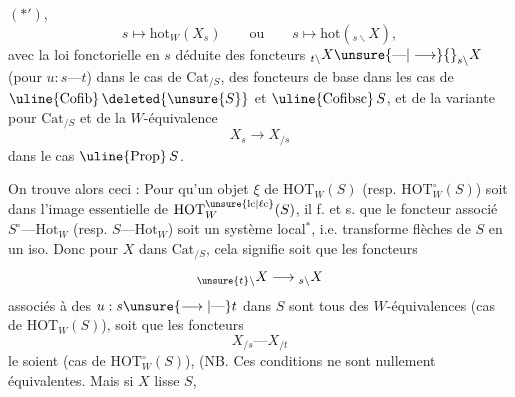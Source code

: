 $(*')$, 
\[
 s\longmapsto\mathrm{hot}_W(X_s)\qquad\text{ou}\qquad s\longmapsto\mathrm{hot}({}_{s\backslash}X),
\]
avec la loi fonctorielle en $s$ déduite des foncteurs ${}_{t\backslash}X\unsure{\text{---}|\longrightarrow}{}_{s\backslash}X$ (pour $u:s\text{---}t$) dans le cas de $\mathrm{Cat}_{/S}$, des foncteurs  de base dans les cas de $\text{\uline{Cofib}}\,\deleted{\unsure{S}}$ et $\text{\uline{Cofibsc}}\,S$, et de la variante pour $\mathrm{Cat}_{/S}$ et de la $W$-équivalence
\[
 X_s\longrightarrow X_{/s}
\]
dans le cas  $\text{\uline{Prop}}\,S$.

On trouve alors ceci :
Pour qu'un objet $\xi$ de $\mathrm{HOT}_W(S)$ (resp. $\mathrm{HOT}^\circ_W(S)$) soit dans l'image essentielle de $\mathrm{HOT}^{\unsure{\mathrm{lc}|\ell\mathrm{c}}}_W(S)$, il f. et s. que le foncteur associé $S^\circ\text{---}\mathrm{Hot}_W$ (resp. $S\text{---}\mathrm{Hot}_W$) soit un système local${}^*$, i.e. transforme  flèches de $S$ en un iso. 
Donc pour  $X$ dans $\mathrm{Cat}_{/S}$, cela signifie soit que les foncteurs
\[
 {}_{\unsure{t}\backslash}X\longrightarrow{}_{s\backslash}X
\]
associés à des $u:s\unsure{\longrightarrow|\text{---}}t$ dans $S$ sont tous des $W$-équivalences (cas de $\mathrm{HOT}_W(S)$), soit que les foncteurs
\[
 X_{/s}\text{---}X_{/t}
\]
le soient (cas de $\mathrm{HOT}^\circ_W(S)$), (NB.  Ces conditions ne sont nullement équivalentes. Mais si $X$ lisse $S$,
